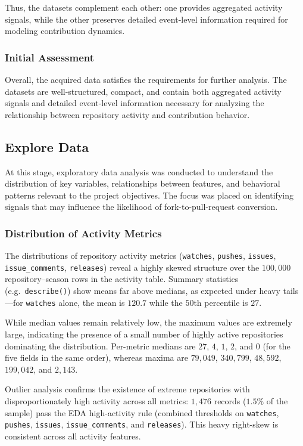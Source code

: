 Thus, the datasets complement each other: one provides aggregated activity signals, while the other preserves detailed event-level information required for modeling contribution dynamics.

\subsubsection{Initial Assessment}

Overall, the acquired data satisfies the requirements for further analysis. The datasets are well-structured, compact, and contain both aggregated activity signals and detailed event-level information necessary for analyzing the relationship between repository activity and contribution behavior.



\subsection{Explore Data}

At this stage, exploratory data analysis was conducted to understand the distribution of key variables, relationships between features, and behavioral patterns relevant to the project objectives. The focus was placed on identifying signals that may influence the likelihood of fork-to-pull-request conversion.

\subsubsection{Distribution of Activity Metrics}

The distributions of repository activity metrics (\texttt{watches}, \texttt{pushes}, \texttt{issues}, \texttt{issue\_comments}, \texttt{releases}) reveal a highly skewed structure over the $100{,}000$ repository--season rows in the activity table. Summary statistics (e.g.\ \texttt{describe()}) show means far above medians, as expected under heavy tails---for \texttt{watches} alone, the mean is $120.7$ while the $50$th percentile is $27$.

While median values remain relatively low, the maximum values are extremely large, indicating the presence of a small number of highly active repositories dominating the distribution. Per-metric medians are $27$, $4$, $1$, $2$, and $0$ (for the five fields in the same order), whereas maxima are $79{,}049$, $340{,}799$, $48{,}592$, $199{,}042$, and $2{,}143$.

Outlier analysis confirms the existence of extreme repositories with disproportionately high activity across all metrics: $1{,}476$ records ($1.5\%$ of the sample) pass the EDA high-activity rule (combined thresholds on \texttt{watches}, \texttt{pushes}, \texttt{issues}, \texttt{issue\_comments}, and \texttt{releases}). This heavy right-skew is consistent across all activity features.

